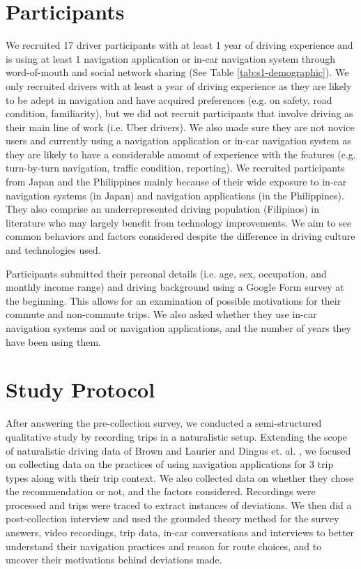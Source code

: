 \section{Participants} 
We recruited 17 driver participants with at least 1 year of driving experience and is using at least 1 navigation application or in-car navigation system through word-of-mouth and social network sharing (See Table \ref{tab:s1-demographic}). We only recruited drivers with at least a year of driving experience as they are likely to be adept in navigation and have acquired preferences (e.g. on safety, road condition, familiarity), but we did not recruit participants that involve driving as their main line of work (i.e. Uber drivers). We also made sure they are not novice users and currently using a navigation application or in-car navigation system as they are likely to have a considerable amount of experience with the features (e.g. turn-by-turn navigation, traffic condition, reporting). We recruited participants from Japan and the Philippines mainly because of their wide exposure to in-car navigation systems (in Japan) and navigation applications (in the Philippines). They also comprise an underrepresented driving population (Filipinos) in literature who may largely benefit from technology improvements. We aim to see common behaviors and factors considered despite the difference in driving culture and technologies used.  

Participants submitted their personal details (i.e. age, sex, occupation, and monthly income range) and driving background using a Google Form survey at the beginning. This allows for an examination of possible motivations for their commute and non-commute trips. We also asked whether they use in-car navigation systems and or navigation applications, and the number of years they have been using them. 

\section{Study Protocol}
After answering the pre-collection survey, we conducted a semi-structured qualitative study \cite{Soegaard2013} by recording trips in a naturalistic setup. Extending the scope of naturalistic driving data of Brown and Laurier \cite{Brown2012TheGPS} and Dingus et. al. \cite{Dingus1997a}, we focused on collecting data on the practices of using navigation applications for 3 trip types along with their trip context. We also collected data on whether they chose the recommendation or not, and the factors considered. Recordings were processed and trips were traced to extract instances of deviations. We then did a post-collection interview and used the grounded theory method \cite{Muller2016MachineMethod,Muller2014CuriosityMethod} for the survey answers, video recordings, trip data, in-car conversations and interviews to better understand their navigation practices and reason for route choices, and to uncover their motivations behind deviations made. 

